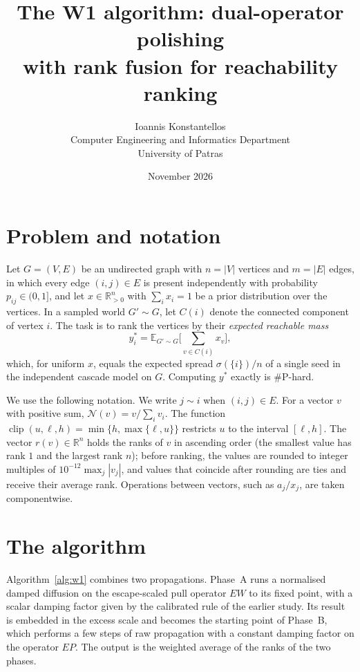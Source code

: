 \documentclass[11pt,a4paper]{article}
\title{\textbf{The W1 algorithm: dual-operator polishing\\ with rank fusion for reachability ranking}}
\author{Ioannis Konstantellos\\[2pt]
\small Computer Engineering and Informatics Department\\
\small University of Patras}
\date{November 2026}
\newcommand{\N}{\mathcal{N}}
\DeclareMathOperator{\clip}{clip}
\begin{document}
\maketitle

\section{Problem and notation}

Let $G=(V,E)$ be an undirected graph with $n=|V|$ vertices and $m=|E|$ edges, in which every edge $(i,j)\in E$ is present independently with probability $p_{ij}\in(0,1]$, and let $x\in\mathbb{R}^n_{>0}$ with $\sum_i x_i=1$ be a prior distribution over the vertices. In a sampled world $G'\sim G$, let $C(i)$ denote the connected component of vertex $i$. The task is to rank the vertices by their \emph{expected reachable mass}
\[
y^*_i=\mathbb{E}_{G'\sim G}\Big[\sum_{v\in C(i)}x_v\Big],
\]
which, for uniform $x$, equals the expected spread $\sigma(\{i\})/n$ of a single seed in the independent cascade model on $G$. Computing $y^*$ exactly is \#P-hard.

We use the following notation. We write $j\sim i$ when $(i,j)\in E$. For a vector $v$ with positive sum, $\N(v)=v/\sum_i v_i$. The function $\clip(u,\ell,h)=\min\{h,\max\{\ell,u\}\}$ restricts $u$ to the interval $[\ell,h]$. The vector $r(v)\in\mathbb{R}^n$ holds the ranks of $v$ in ascending order (the smallest value has rank $1$ and the largest rank $n$); before ranking, the values are rounded to integer multiples of $10^{-12}\max_j|v_j|$, and values that coincide after rounding are ties and receive their average rank. Operations between vectors, such as $a_j/x_j$, are taken componentwise.

\section{The algorithm}

Algorithm~\ref{alg:w1} combines two propagations. Phase~A runs a normalised damped diffusion on the escape-scaled pull operator $EW$ to its fixed point, with a scalar damping factor given by the calibrated rule of the earlier study. Its result is embedded in the excess scale and becomes the starting point of Phase~B, which performs a few steps of raw propagation with a constant damping factor on the operator $EP$. The output is the weighted average of the ranks of the two phases.
\end{document}
